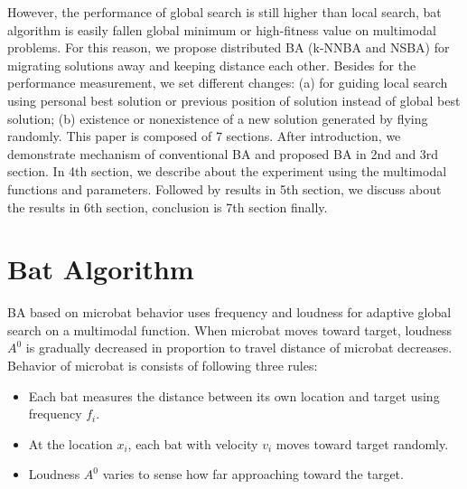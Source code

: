\documentclass{ies2018}
\begin{document}
  However, the performance of global search is still higher than local search, bat algorithm is easily fallen global minimum or high-fitness value on multimodal problems. For this reason, we propose distributed BA (k-NNBA and NSBA) for migrating solutions away and keeping distance each other. Besides for the performance measurement, we set different changes: (a) for guiding local search using personal best solution or previous position of solution instead of global best solution; (b) existence or nonexistence of a new solution generated by flying randomly. 
This paper is composed of 7 sections. After introduction, we demonstrate mechanism of conventional BA and proposed BA in 2nd and 3rd section. In 4th section, we describe about the experiment using the multimodal functions and parameters. Followed by results in 5th section, we discuss about the results in 6th section, conclusion is 7th section finally.

\section{Bat Algorithm}
BA based on microbat behavior uses frequency and loudness for adaptive global search on a multimodal function.
 When microbat moves toward target, loudness ${A^0}$ is gradually decreased in proportion to travel distance of microbat decreases. Behavior of microbat is consists of following three rules: 

\begin{itemize}
\item Each bat measures the distance between its own location and target using frequency ${f_i}$.
\item At the location ${x_i}$, each bat with velocity ${v_i}$ moves toward target randomly.
\item Loudness ${A^0}$ varies to sense how far approaching toward the target.  
\end{itemize}
\end{document}
